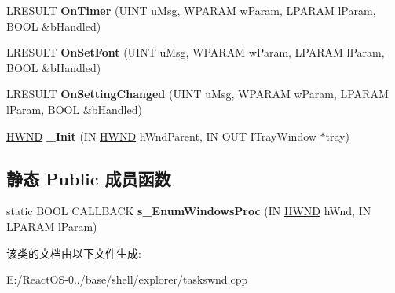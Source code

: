 \begin{DoxyCompactItemize}
\item 
\mbox{\label{class_c_task_switch_wnd_a18452461f9f170b2d93bf888de4bfd2d}} 
L\+R\+E\+S\+U\+LT {\bfseries On\+Timer} (U\+I\+NT u\+Msg, W\+P\+A\+R\+AM w\+Param, L\+P\+A\+R\+AM l\+Param, B\+O\+OL \&b\+Handled)
\item 
\mbox{\label{class_c_task_switch_wnd_ac6e5532be4747e553d2470e1dd77b0fa}} 
L\+R\+E\+S\+U\+LT {\bfseries On\+Set\+Font} (U\+I\+NT u\+Msg, W\+P\+A\+R\+AM w\+Param, L\+P\+A\+R\+AM l\+Param, B\+O\+OL \&b\+Handled)
\item 
\mbox{\label{class_c_task_switch_wnd_a60569c3e8037a804fa3b06ac46f9f8ce}} 
L\+R\+E\+S\+U\+LT {\bfseries On\+Setting\+Changed} (U\+I\+NT u\+Msg, W\+P\+A\+R\+AM w\+Param, L\+P\+A\+R\+AM l\+Param, B\+O\+OL \&b\+Handled)
\item 
\mbox{\label{class_c_task_switch_wnd_a189c0ade6a83a74fbd6af2c64695f748}} 
\hyperlink{interfacevoid}{H\+W\+ND} {\bfseries \+\_\+\+Init} (IN \hyperlink{interfacevoid}{H\+W\+ND} h\+Wnd\+Parent, IN O\+UT I\+Tray\+Window $\ast$tray)
\end{DoxyCompactItemize}
\subsection*{静态 Public 成员函数}
\begin{DoxyCompactItemize}
\item 
\mbox{\label{class_c_task_switch_wnd_a07a3246cf80f47f9ac8d9781cc2b1da0}} 
static B\+O\+OL C\+A\+L\+L\+B\+A\+CK {\bfseries s\+\_\+\+Enum\+Windows\+Proc} (IN \hyperlink{interfacevoid}{H\+W\+ND} h\+Wnd, IN L\+P\+A\+R\+AM l\+Param)
\end{DoxyCompactItemize}


该类的文档由以下文件生成\+:\begin{DoxyCompactItemize}
\item 
E\+:/\+React\+O\+S-\/0../base/shell/explorer/taskswnd.\+cpp\end{DoxyCompactItemize}
